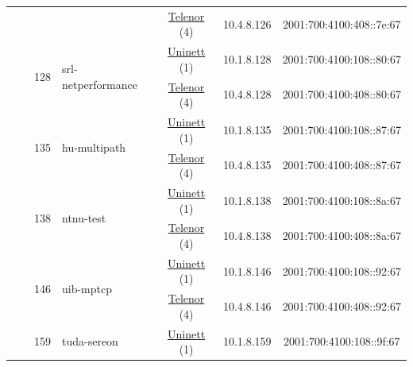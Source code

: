 \begin{small}
\begin{center}
\begin{longtable}{|c|c|c|c|c|c|c|c|}
  &  &  &  & \multicolumn{2}{|c|}{\tiny{\href{https://www.telenor.no}{Telenor} (4)}} & \tiny{10.4.8.126} & \tiny{2001:700:4100:408::7e:67} \\* \cline{3-3}\cline{4-4}\cline{5-5}\cline{6-6}\cline{7-7}\cline{8-8}
  &  & \multirow{2}{*}{\tiny{128}} & \multicolumn{1}{|l|}{\multirow{2}{*}{\tiny{srl-netperformance}}} & \multicolumn{2}{|c|}{\tiny{\href{https://www.uninett.no}{Uninett} (1)}} & \tiny{10.1.8.128} & \tiny{2001:700:4100:108::80:67} \\* \cline{5-5}\cline{6-6}\cline{7-7}\cline{8-8}
  &  &  &  & \multicolumn{2}{|c|}{\tiny{\href{https://www.telenor.no}{Telenor} (4)}} & \tiny{10.4.8.128} & \tiny{2001:700:4100:408::80:67} \\* \cline{3-3}\cline{4-4}\cline{5-5}\cline{6-6}\cline{7-7}\cline{8-8}
  &  & \multirow{2}{*}{\tiny{135}} & \multicolumn{1}{|l|}{\multirow{2}{*}{\tiny{hu-multipath}}} & \multicolumn{2}{|c|}{\tiny{\href{https://www.uninett.no}{Uninett} (1)}} & \tiny{10.1.8.135} & \tiny{2001:700:4100:108::87:67} \\* \cline{5-5}\cline{6-6}\cline{7-7}\cline{8-8}
  &  &  &  & \multicolumn{2}{|c|}{\tiny{\href{https://www.telenor.no}{Telenor} (4)}} & \tiny{10.4.8.135} & \tiny{2001:700:4100:408::87:67} \\* \cline{3-3}\cline{4-4}\cline{5-5}\cline{6-6}\cline{7-7}\cline{8-8}
  &  & \multirow{2}{*}{\tiny{138}} & \multicolumn{1}{|l|}{\multirow{2}{*}{\tiny{ntnu-test}}} & \multicolumn{2}{|c|}{\tiny{\href{https://www.uninett.no}{Uninett} (1)}} & \tiny{10.1.8.138} & \tiny{2001:700:4100:108::8a:67} \\* \cline{5-5}\cline{6-6}\cline{7-7}\cline{8-8}
  &  &  &  & \multicolumn{2}{|c|}{\tiny{\href{https://www.telenor.no}{Telenor} (4)}} & \tiny{10.4.8.138} & \tiny{2001:700:4100:408::8a:67} \\* \cline{3-3}\cline{4-4}\cline{5-5}\cline{6-6}\cline{7-7}\cline{8-8}
  &  & \multirow{2}{*}{\tiny{146}} & \multicolumn{1}{|l|}{\multirow{2}{*}{\tiny{uib-mptcp}}} & \multicolumn{2}{|c|}{\tiny{\href{https://www.uninett.no}{Uninett} (1)}} & \tiny{10.1.8.146} & \tiny{2001:700:4100:108::92:67} \\* \cline{5-5}\cline{6-6}\cline{7-7}\cline{8-8}
  &  &  &  & \multicolumn{2}{|c|}{\tiny{\href{https://www.telenor.no}{Telenor} (4)}} & \tiny{10.4.8.146} & \tiny{2001:700:4100:408::92:67} \\* \cline{3-3}\cline{4-4}\cline{5-5}\cline{6-6}\cline{7-7}\cline{8-8}
  &  & \multirow{2}{*}{\tiny{159}} & \multicolumn{1}{|l|}{\multirow{2}{*}{\tiny{tuda-sereon}}} & \multicolumn{2}{|c|}{\tiny{\href{https://www.uninett.no}{Uninett} (1)}} & \tiny{10.1.8.159} & \tiny{2001:700:4100:108::9f:67} \\* \cline{5-5}\cline{6-6}\cline{7-7}\cline{8-8}

\end{longtable}
\end{center}
\end{small}
